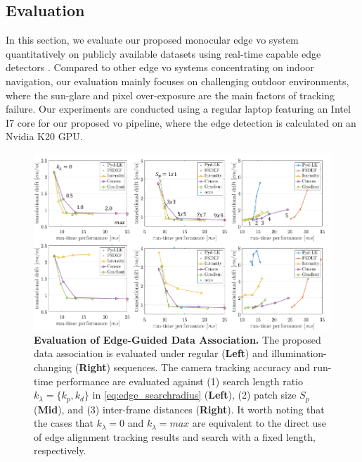\subsection{Evaluation}
In this section, we evaluate our proposed monocular edge \acrshort{vo} system quantitatively on publicly available datasets \cite{gaidon2016virtual}  \cite{griffith2017symphony} \cite{geiger2012we} using real-time capable edge detectors \cite{canny1987computational} \cite{dollar2013structured} \cite{xie2015holistically}. 
Compared to other edge \acrshort{vo} systems concentrating on indoor navigation, our evaluation mainly focuses on challenging outdoor environments, where the sun-glare and pixel over-exposure are the main factors of tracking failure. 
Our experiments are conducted using a regular laptop featuring an Intel I7 core for our proposed \acrshort{vo} pipeline, where the edge detection is calculated on an Nvidia K20 GPU.

\begin{figure}[t] 
  	\centering
  	\includegraphics[width=1.0\linewidth]{figures/illumination/edge_paramstudy.pdf}
    \caption[Evaluation of Edge-Guided Data Association]{ \textbf{Evaluation of Edge-Guided Data Association.} The proposed data association is evaluated under regular (\textbf{Left}) and illumination-changing (\textbf{Right}) sequences. The camera tracking accuracy and run-time performance are evaluated against (1) search length ratio $k_{\lambda} = \{ k_{p}, k_{d}\}$ in \ref{eq:edge_searchradius} (\textbf{Left}), (2) patch size $S_p$ (\textbf{Mid}), and (3) inter-frame distances (\textbf{Right}). It worth noting that the cases that $k_{\lambda} = 0$ and $k_{\lambda} = max$ are equivalent to the direct use of edge alignment tracking results and search with a fixed length, respectively.
	\label{fig:edge_paramstudy}}
\end{figure}

